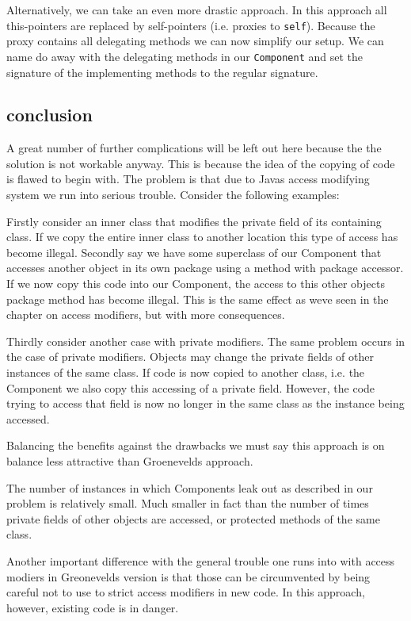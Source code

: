 \documentclass[a4paper,12pt]{book}
\begin{document}
Alternatively, we can take an even more drastic approach. In this approach all this-pointers are replaced by self-pointers (i.e. proxies to \verb|self|). Because the proxy contains all delegating methods we can now simplify our setup. We can name do away with the delegating methods in our \verb|Component| and set the signature of the implementing methods to the regular signature.

\subsection*{conclusion}
A great number of further complications will be left out here because the the solution is not workable anyway. This is because the idea of the copying of code is flawed to begin with. The problem is that due to Javas access modifying system we run into serious trouble. Consider the following examples:

Firstly consider an inner class that modifies the private field of its containing class. If we copy the entire inner class to another location this type of access has become illegal. Secondly say we have some superclass of our Component that accesses another object in its own package using a method with package accessor. If we now copy this code into our Component, the access to this other objects package method has become illegal. This is the same effect as weve seen in the chapter on access modifiers, but with more consequences.

Thirdly consider another case with private modifiers. The same problem occurs in the case of private modifiers. Objects may change the private fields of other instances of the same class. If code is now copied to another class, i.e. the Component we also copy this accessing of a private field. However, the code trying to access that field is now no longer in the same class as the instance being accessed.

Balancing the benefits against the drawbacks we must say this approach is on balance less attractive than Groenevelds approach.

The number of instances in which Components leak out as described in our problem is relatively small. Much smaller in fact than the number of times private fields of other objects are accessed, or protected methods of the same class.

Another important difference with the general trouble one runs into with access modiers in Greonevelds version is that those can be circumvented by being careful not to use to strict access modifiers in new code. In this approach, however, existing code is in danger.
\end{document}
